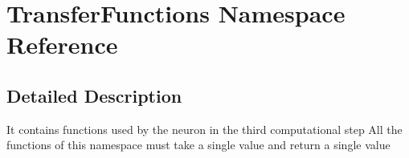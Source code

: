 \hypertarget{namespace_transfer_functions}{\section{Transfer\-Functions Namespace Reference}
\label{namespace_transfer_functions}
}


\subsection{Detailed Description}
It contains functions used by the neuron in the third computational step All the functions of this namespace must take a single value and return a single value 